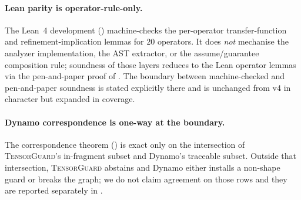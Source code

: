 \paragraph{Lean parity is operator-rule-only.} The Lean~4
development () machine-checks the
per-operator transfer-function and refinement-implication lemmas
for $20$ operators. It does \emph{not} mechanise the analyzer
implementation, the AST extractor, or the assume/guarantee
composition rule; soundness of those layers reduces to the Lean
operator lemmas via the pen-and-paper proof of
. The boundary between machine-checked
and pen-and-paper soundness is stated explicitly there and is
unchanged from v4 in character but expanded in coverage.

\paragraph{Dynamo correspondence is one-way at the boundary.} The
correspondence theorem () is exact only on
the intersection of \textsc{TensorGuard}'s in-fragment subset and
Dynamo's traceable subset. Outside that intersection,
\textsc{TensorGuard} abstains and Dynamo either installs a
non-shape guard or breaks the graph; we do not claim agreement
on those rows and they are reported separately in
.
